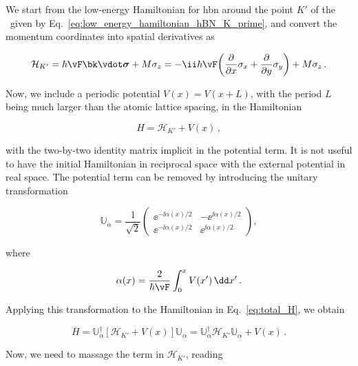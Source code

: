 We start from the low-energy Hamiltonian for \gls{hbn} around the point $K'$ of the \bz~given by Eq.~\eqref{eq:low_energy_hamiltonian_hBN_K_prime}, and convert the momentum coordinates into spatial derivatives as

\begin{equation}
    \mathcal{H}_{K'}  = \hbar \vF \bk\vdot\boldsymbol{\sigma}+M\sigma_{z}=-\ii \hbar \vF \! \left(\frac{\partial}{\partial x}\sigma_{x}+\frac{\partial}{\partial y}\sigma_{y}\right)+M\sigma_{z}\,.
\end{equation}

\noindent Now, we include a periodic potential $V(x)=V(x+L)$, with the period $L$ being much larger than the atomic lattice spacing, in the Hamiltonian

\begin{equation}
    \label{eq:total_H}
    H = \mathcal{H}_{K'}  + V(x)\,,
\end{equation}

\noindent with the two-by-two identity matrix implicit in the potential term.
It is not useful to have the initial Hamiltonian in reciprocal space with the external potential in real space.
The potential term can be removed by introducing the unitary transformation

\begin{equation}
    \mathbb{U}_{\alpha}=\frac{1}{\sqrt{2}}\left(
    \begin{array}{cc}
       \ee^{-\ii \alpha(x)/2} & -\ee^{\ii \alpha(x)/2}\\
       \ee^{-\ii \alpha(x)/2} & \ee^{\ii \alpha(x)/2}
    \end{array}\right),
\end{equation}

\noindent where

\begin{equation}
    \alpha(x)=\frac{2}{\hbar \vF}\int_{0}^{x} V(x') \,\dd x'\,.
\end{equation}

\noindent Applying this transformation to the Hamiltonian in Eq.~\eqref{eq:total_H}, we obtain

\begin{equation}
    \label{eq:transformed_H}
    \overline{H}=\mathbb{U}_{\alpha}^{\dagger}[\mathcal{H}_{K'} +V(x)]\mathbb{U}_{\alpha}=\mathbb{U}_{\alpha}^{\dagger}\mathcal{H}_{K'} \mathbb{U}_{\alpha}+V(x)\,.
\end{equation}

\noindent Now, we need to massage the term in $\mathcal{H}_{K'}$, reading

